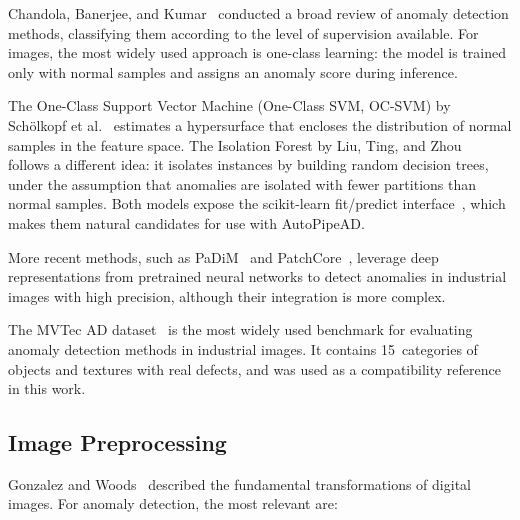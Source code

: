 \documentclass[conference]{IEEEtran}
\begin{document}
Chandola, Banerjee, and Kumar~\cite{chandola2009anomaly} conducted a broad
review of anomaly detection methods, classifying them according to the level
of supervision available. For images, the most widely used approach is
one-class learning: the model is trained only with normal samples and assigns
an anomaly score during inference.

The One-Class Support Vector Machine (One-Class SVM, OC-SVM) by
Schölkopf et al.~\cite{scholkopf2001ocsvm} estimates a hypersurface that
encloses the distribution of normal samples in the feature space. The
Isolation Forest by Liu, Ting, and Zhou~\cite{liu2012isolation} follows a
different idea: it isolates instances by building random decision trees, under
the assumption that anomalies are isolated with fewer partitions than normal
samples. Both models expose the scikit-learn fit/predict
interface~\cite{pedregosa2011sklearn}, which makes them natural candidates for
use with AutoPipeAD.

More recent methods, such as PaDiM~\cite{defard2021padim} and
PatchCore~\cite{roth2022patchcore}, leverage deep representations from
pretrained neural networks to detect anomalies in industrial images with high
precision, although their integration is more complex.

The MVTec AD dataset~\cite{bergmann2019mvtec} is the most widely used
benchmark for evaluating anomaly detection methods in industrial images. It
contains 15~categories of objects and textures with real defects, and was
used as a compatibility reference in this work.

\subsection{Image Preprocessing}

Gonzalez and Woods~\cite{gonzalez2018dip} described the fundamental
transformations of digital images. For anomaly detection, the most relevant
are:
\end{document}
